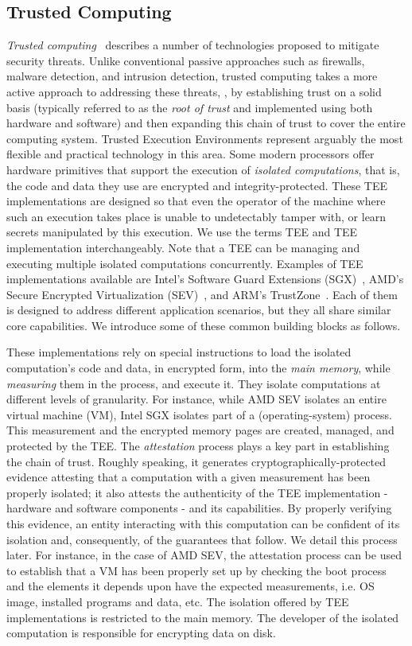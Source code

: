 
\subsection{Trusted Computing}
\label{subsec:tc}
\emph{Trusted computing}~\cite{mitchell2005trusted, tc2013trusted} describes a number of technologies proposed to 
mitigate security threats. Unlike conventional passive approaches such as firewalls, 
malware detection, and intrusion detection, trusted computing takes a more active approach to 
addressing these threats, \ie, by establishing trust on a solid basis (typically referred to as the \emph{root of trust} and implemented using both 
hardware and software) and then expanding this chain of trust to cover the entire 
computing system. Trusted Execution Environments represent arguably the most flexible and practical technology in this area. Some modern processors offer hardware primitives that support the execution of \emph{isolated computations}, that is, the code and data they use are encrypted and integrity-protected. These TEE implementations are designed so that even the operator of the machine where such an execution takes place is unable to undetectably tamper with, or learn secrets manipulated by this execution. We use the terms TEE and TEE implementation interchangeably. Note that a TEE can be managing and executing multiple isolated computations concurrently. Examples of TEE implementations available are
Intel’s Software Guard Extensions (SGX)~\cite{costan2016intel}, 
AMD’s Secure Encrypted Virtualization (SEV)~\cite{sev2020strengthening}, and 
ARM’s TrustZone~\cite{pinto2019demystifying}.  Each of them is designed to address different application scenarios, but they all share similar core capabilities. We introduce some of these common building blocks as follows. 

These implementations rely on special instructions to load the isolated computation's code and data, in encrypted form, into the \emph{main memory}, while \emph{measuring} them in the process, and execute it. They isolate computations at different levels of granularity. For instance, while AMD SEV isolates an entire virtual machine (VM), Intel SGX isolates part of a (operating-system) process. This measurement and the encrypted memory pages are created, managed, and protected by the TEE. The \emph{attestation} process plays a key part in establishing the chain of trust. Roughly speaking, it generates cryptographically-protected evidence attesting that a computation with a given measurement has been properly isolated; it also attests the authenticity of the TEE implementation - hardware and software components - and its capabilities. By properly verifying this evidence, an entity interacting with this computation can be confident of its isolation and, consequently, of the guarantees that follow. We detail this process later. For instance, in the case of AMD SEV, the attestation process can be used to establish that a VM has been properly set up by checking the boot process and the elements it depends upon have the expected measurements, i.e. OS image, installed programs and data, etc. The isolation offered by TEE implementations is restricted to the main memory. The developer of the isolated computation is responsible for encrypting data on disk.


